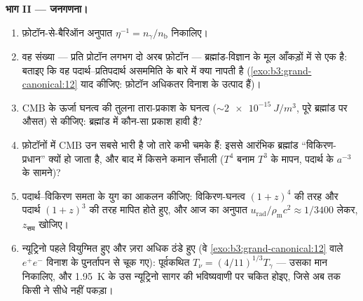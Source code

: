 \begin{problem}
\medskip\noindent\textbf{भाग II --- जनगणना।}
\begin{enumerate}[resume]
  \item फ़ोटॉन-से-बैरिऑन अनुपात $\eta^{-1} =
        n_\gamma/n_{\text{b}}$ निकालिए।
  \item वह संख्या --- प्रति प्रोटॉन लगभग दो अरब फ़ोटॉन ---
        ब्रह्मांड-विज्ञान के मूल आँकड़ों में से एक है: बताइए कि वह
        पदार्थ--प्रतिपदार्थ असममिति के बारे में क्या नापती है
        (\cref{exo:b3:grand-canonical:12} याद कीजिए: फ़ोटॉन
        अधिकतर विनाश के उत्पाद हैं)।
  \item CMB के ऊर्जा घनत्व की तुलना तारा-प्रकाश के घनत्व
        ($\sim\qty{2e-15}{J/m^3}$, पूरे ब्रह्मांड पर औसत) से कीजिए:
        ब्रह्मांड में कौन-सा प्रकाश हावी है?
  \item फ़ोटॉनों में CMB उन सबसे भारी है जो तारे कभी चमके हैं:
        इससे आरंभिक ब्रह्मांड ``विकिरण-प्रधान'' क्यों हो जाता है,
        और बाद में किसने कमान सँभाली ($T^4$ बनाम $T^3$ के मापन,
        पदार्थ के $a^{-3}$ के सामने)?
  \item पदार्थ--विकिरण समता के युग का आकलन कीजिए: विकिरण-घनत्व
        $(1+z)^4$ की तरह और पदार्थ $(1+z)^3$ की तरह मापित होते
        हुए, और आज का अनुपात
        $u_{\text{rad}}/\rho_{\text{m}}c^2 \approx 1/3400$ लेकर,
        $z_{\text{सम}}$ खोजिए।
  \item न्यूट्रिनो पहले वियुग्मित हुए और ज़रा अधिक ठंडे हुए
        (वे \cref{exo:b3:grand-canonical:12} वाले $e^+e^-$ विनाश
        के पुनर्तापन से चूक गए): पूर्वकथित
        $T_\nu = (4/11)^{1/3}T_\gamma$ --- उसका मान निकालिए, और
        \qty{1.95}{K} के उस न्यूट्रिनो सागर की भविष्यवाणी पर चकित
        होइए, जिसे अब तक किसी ने सीधे नहीं पकड़ा।
\end{enumerate}


\end{problem}
